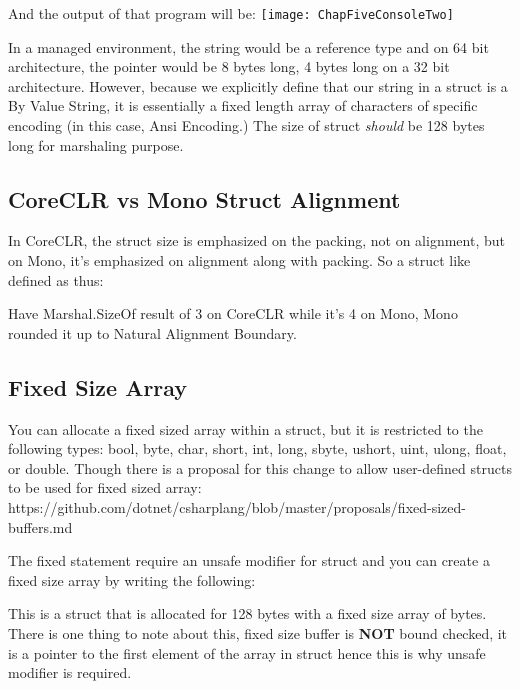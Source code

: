 

And the output of that program will be:
\newline
\newline
\texttt{[image: ChapFiveConsoleTwo]}
\newpage

In a managed environment, the string would be a reference type and on 64 bit architecture, the pointer would be 8 bytes long, 4 bytes long on a 32 bit architecture. However, because we explicitly define that our string in a struct is a By Value String, it is essentially a fixed length array of characters of specific encoding (in this case, Ansi Encoding.) The size of struct \textit{should} be 128 bytes long for marshaling purpose.

\subsection{CoreCLR vs Mono Struct Alignment}
In CoreCLR, the struct size is emphasized on the packing, not on alignment, but on Mono, it's emphasized on alignment along with packing. So a struct like defined as thus:



Have Marshal.SizeOf result of 3 on CoreCLR while it's 4 on Mono, Mono rounded it up to Natural Alignment Boundary.

\subsection{Fixed Size Array}
You can allocate a fixed sized array within a struct, but it is restricted to the following types: bool, byte, char, short, int, long, sbyte, ushort, uint, ulong, float, or double. Though there is a proposal for this change to allow user-defined structs to be used for fixed sized array: \newline \newline
https://github.com/dotnet/csharplang/blob/master/proposals/fixed-sized-buffers.md
\newline \newline

The fixed statement require an unsafe modifier for struct and you can create a fixed size array by writing the following:



This is a struct that is allocated for 128 bytes with a fixed size array of bytes. There is one thing to note about this, fixed size buffer is \textbf{NOT} bound checked, it is a pointer to the first element of the array in struct hence this is why unsafe modifier is required.

